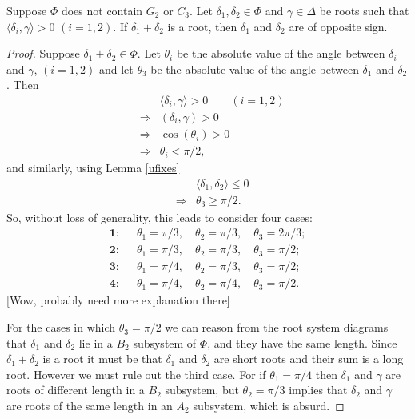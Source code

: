 \begin{lemma} \label{uabelian}
Suppose $\Phi$ does not contain $G_2$ or $C_3$. Let $\delta_1, \delta_2 \in \Phi$ and $\gamma \in \Delta$ be roots such that $\langle \delta_i, \gamma \rangle > 0$ $(i = 1, 2)$. If $\delta_1 + \delta_2$ is a root, then $\delta_1$ and $\delta_2$ are of opposite sign.
\end{lemma}
\begin{proof}
Suppose $\delta_1 + \delta_2 \in \Phi$. Let $\theta_i$ be the absolute value of the angle between $\delta_i$ and $\gamma$, $(i = 1,2)$ and let $\theta_3$ be the absolute value of the angle between $\delta_1$ and $\delta_2$. Then
\begin{eqnarray*}
&& \langle \delta_i, \gamma\rangle > 0 \qquad (i=1,2) \\
& \Longrightarrow& (\delta_i, \gamma) > 0 \\
& \Longrightarrow& \cos(\theta_i) > 0 \\
& \Longrightarrow& \theta_i < \pi/2,
\end{eqnarray*}
and similarly, using Lemma \ref{ufixes}
\begin{eqnarray*}
&& \langle \delta_1, \delta_2 \rangle \leq 0 \\
& \Longrightarrow& \theta_3 \geq \pi/2.
\end{eqnarray*}
So, without loss of generality, this leads to consider four cases:
\begin{eqnarray*}
\textbf{1:}&&\theta_1 = \pi/3,\quad\theta_2 = \pi/3,\quad\theta_3 = 2\pi/3; \\
\textbf{2:}&&\theta_1 = \pi/3,\quad\theta_2 = \pi/3,\quad\theta_3 = \pi/2; \\
\textbf{3:}&&\theta_1 = \pi/4,\quad\theta_2 = \pi/3,\quad\theta_3 = \pi/2; \\
\textbf{4:}&&\theta_1 = \pi/4,\quad\theta_2 = \pi/4,\quad\theta_3 = \pi/2.
\end{eqnarray*}
[Wow, probably need more explanation there] 

For the cases in which $\theta_3 = \pi/2$ we can reason from the root system diagrams that $\delta_1$ and $\delta_2$ lie in a $B_2$ subsystem of $\Phi$, and they have the same length. Since $\delta_1+\delta_2$ is a root it must be that $\delta_1$ and $\delta_2$ are short roots and their sum is a long root. However we must rule out the third case. For if $\theta_1 = \pi/4$ then $\delta_1$ and $\gamma$ are roots of different length in a $B_2$ subsystem, but $\theta_2 = \pi/3$ implies that $\delta_2$ and $\gamma$ are roots of the same length in an $A_2$ subsystem, which is absurd.


\end{proof}
